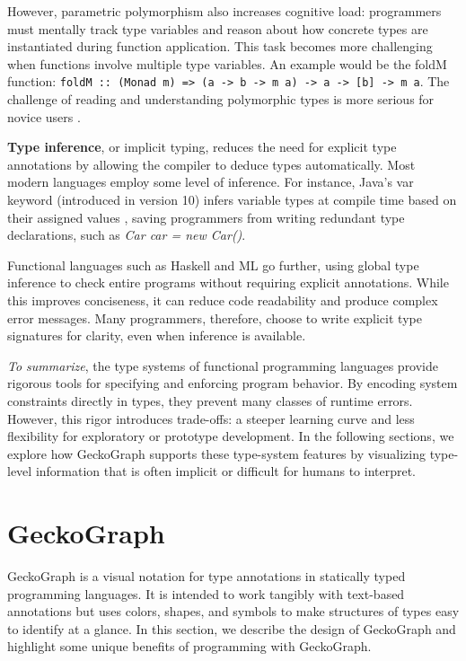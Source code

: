 \documentclass[preprint,12pt]{elsarticle}
\begin{document}
However, parametric polymorphism also increases cognitive load: programmers must mentally track type variables and reason about how concrete types are instantiated during function application. This task becomes more challenging when functions involve multiple type variables. An example would be the foldM function: \texttt{foldM :: (Monad m) => (a -> b -> m a) -> a -> [b] -> m a}. The challenge of reading and understanding polymorphic types is more serious for novice users \cite{Jun2000-ec, Jun2000-yu}.



{\bf Type inference}, or implicit typing, reduces the need for explicit type annotations by allowing the compiler to deduce types automatically.
Most modern languages employ some level of inference. For instance, Java’s var keyword (introduced in version 10) infers variable types at compile time based on their assigned values \cite{Java_Developers2023-an}, saving programmers from writing redundant type declarations, such as \textit {Car car = new Car()}.

Functional languages such as Haskell and ML go further, using global type inference \cite{Damas1982-zw} to check entire programs without requiring explicit annotations. While this improves conciseness, it can reduce code readability and produce complex error messages. Many programmers, therefore, choose to write explicit type signatures for clarity, even when inference is available.




{\it To summarize}, the type systems of functional programming languages provide rigorous tools for specifying and enforcing program behavior. By encoding system constraints directly in types, they prevent many classes of runtime errors. However, this rigor introduces trade-offs: a steeper learning curve and less flexibility for exploratory or prototype development. In the following sections, we explore how GeckoGraph supports these type-system features by visualizing type-level information that is often implicit or difficult for humans to interpret.


\section{GeckoGraph}

GeckoGraph is a visual notation for type annotations in statically typed programming languages. It is intended to work tangibly with text-based annotations but uses colors, shapes, and symbols to make structures of types easy to identify at a glance. In this section, we describe the design of GeckoGraph and highlight some unique benefits of programming with GeckoGraph.
\end{document}
